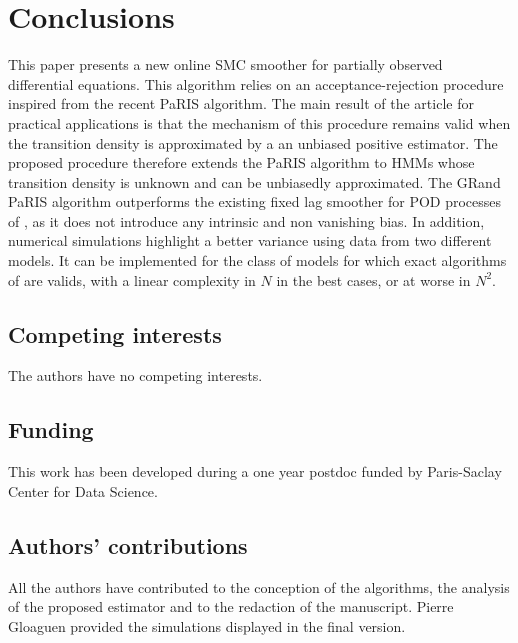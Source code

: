 \documentclass[12pt]{article}
\newcommand{\1}{\mathrm{1}}
\begin{document}
\section{Conclusions}
This paper presents a new online SMC smoother for partially observed differential equations.
 This algorithm relies on an acceptance-rejection procedure inspired from the recent PaRIS algorithm.
 The main result of the article for practical applications is that the mechanism of this procedure remains valid when the transition density is approximated by a an unbiased positive estimator.
  The proposed procedure therefore extends the PaRIS algorithm to HMMs whose transition density is unknown and can be unbiasedly approximated. The GRand PaRIS algorithm outperforms the existing fixed lag smoother for POD processes of \cite{olsson:strojby:2011}, as it does not introduce any intrinsic and non vanishing bias.
   In addition, numerical simulations highlight a better variance using data from two different models.
   It can be implemented for the class of models for which exact algorithms of \cite{beskos:papaspiliopoulos:roberts:fearnhead:2006} are valids, with a linear complexity in $N$ in the best cases, or at worse in $N^2$. 

\subsection*{Competing interests}
The authors have no competing interests. 

\subsection*{Funding}
This work has been developed during a one year postdoc funded by Paris-Saclay Center for Data Science. 

\subsection*{Authors' contributions}
All the authors have contributed to the conception of the algorithms, the analysis of the proposed estimator and to the redaction of the manuscript.
 Pierre Gloaguen provided the simulations displayed in the final version. 

\appendix
\end{document}
